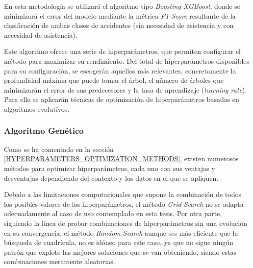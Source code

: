 En esta metodología se utilizará el algoritmo tipo \textit{Boosting XGBoost}, donde se minimizará el error del modelo mediante la métrica \textit{F1-Score} resultante de la clasificación de ambas clases de accidentes (sin necesidad de asistencia y con necesidad de asistencia).

Este algoritmo ofrece una serie de hiperparámetros, que permiten configurar el método para maximizar su rendimiento. Del total de hiperparámetros disponibles para su configuración, se escogerán aquellos más relevantes, concretamente la profundidad máxima que puede tomar el árbol, el número de árboles que minimizarán el error de sus predecesores y  la tasa de aprendizaje (\textit{learning rate}). Para ello se aplicarán técnicas de optimización de hiperparámetros basadas en algoritmos evolutivos.




\subsubsection{Algoritmo Genético}

Como se ha comentado en la sección \ref{HYPERPARAMETERS_OPTIMIZATION_METHODS}, existen numerosos métodos para optimizar hiperparámetros, cada uno con sus ventajas y desventajas dependiendo del contexto y los datos en el que se apliquen.

Debido a las limitaciones computacionales que supone la combinación de todos los posibles valores de los hiperparámetros, el método \textit{Grid Search} no se adapta adecuadamente al caso de uso contemplado en esta tesis. Por otra parte, siguiendo la línea de probar combinaciones de hiperparámetros sin una evolución en su convergencia, el método \textit{Random Search} aunque ses más eficiente que la búsqueda de cuadrícula, no es idóneo para este caso, ya que no sigue ningún patrón que explote las mejores soluciones que se van obteniendo, siendo estas combinaciones meramente aleatorias.

